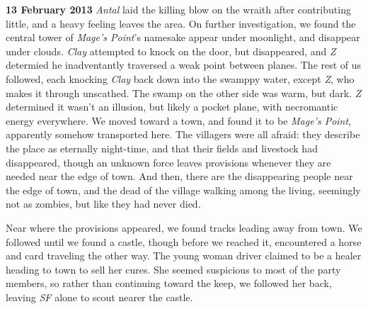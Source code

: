 \documentclass[letterpaper]{article}
\begin{document}
\textbf{13 February 2013} \emph{Antal} laid the killing blow on the wraith after contributing little, and a heavy feeling leaves the area.  On further investigation, we found the central tower of \emph{Mage's Point}'s namesake appear under moonlight, and disappear under clouds.  \emph{Clay} attempted to knock on the door, but disappeared, and \emph{Z} determied he inadventantly traversed a weak point between planes. The rest of us followed, each knocking \emph{Clay} back down into the swamppy water, except \emph{Z}, who makes it through unscathed. The swamp on the other side was warm, but dark. \emph{Z} determined it wasn't an illusion, but likely a pocket plane, with necromantic energy everywhere. We moved toward a town, and found it to be \emph{Mage's Point}, apparently somehow transported here.  The villagers were all afraid: they describe the place as eternally night-time, and that their fields and livestock had disappeared, though an unknown force leaves provisions whenever they are needed near the edge of town.  And then, there are the disappearing people near the edge of town, and the dead of the village walking among the living, seemingly not as zombies, but like they had never died.\par
Near where the provisions appeared, we found tracks leading away from town.  We followed until we found a castle, though before we reached it, encountered a horse and card traveling the other way.  The young woman driver claimed to be a healer heading to town to sell her cures.  She seemed suspicious to most of the party members, so rather than continuing toward the keep, we followed her back, leaving \emph{SF} alone to scout nearer the castle.\\
\end{document}
